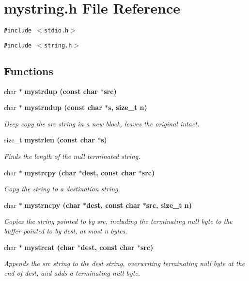 \section{mystring.h File Reference}
\label{mystring_8h}
{\tt \#include $<$stdio.h$>$}\par
{\tt \#include $<$string.h$>$}\par
\subsection*{Functions}
\begin{CompactItemize}
\item 
char $\ast$ \bf{mystrdup} (const char $\ast$src)
\item 
char $\ast$ \bf{mystrndup} (const char $\ast$s, size\_\-t n)
\begin{CompactList}\small\item\em Deep copy the src string in a new block, leaves the original intact. \item\end{CompactList}\item 
size\_\-t \bf{mystrlen} (const char $\ast$s)
\begin{CompactList}\small\item\em Finds the length of the null terminated string. \item\end{CompactList}\item 
char $\ast$ \bf{mystrcpy} (char $\ast$dest, const char $\ast$src)
\begin{CompactList}\small\item\em Copy the string to a destination string. \item\end{CompactList}\item 
char $\ast$ \bf{mystrncpy} (char $\ast$dest, const char $\ast$src, size\_\-t n)
\begin{CompactList}\small\item\em Copies the string pointed to by src, including the terminating null byte to the buffer pointed to by dest, at most n bytes. \item\end{CompactList}\item 
char $\ast$ \bf{mystrcat} (char $\ast$dest, const char $\ast$src)
\begin{CompactList}\small\item\em Appends the src string to the dest string, overwriting terminating null byte at the end of dest, and adds a terminating null byte. \item\end{CompactList}\item 

\end{CompactItemize}
